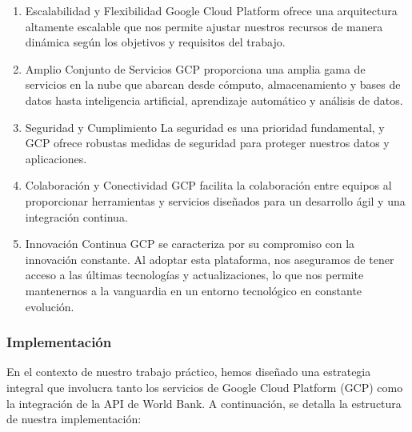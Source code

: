 \documentclass{other/docTemplate}
\begin{document}
\begin{enumerate}
\item Escalabilidad y Flexibilidad Google Cloud Platform ofrece una arquitectura altamente escalable que nos permite ajustar nuestros recursos de manera dinámica según los objetivos y requisitos del trabajo.  
\item Amplio Conjunto de Servicios GCP proporciona una amplia gama de servicios en la nube que abarcan desde cómputo, almacenamiento y bases de datos hasta inteligencia artificial, aprendizaje automático y análisis de datos. 
\item Seguridad y Cumplimiento La seguridad es una prioridad fundamental, y GCP ofrece robustas medidas de seguridad para proteger nuestros datos y aplicaciones. 
\item Colaboración y Conectividad GCP facilita la colaboración entre equipos al proporcionar herramientas y servicios diseñados para un desarrollo ágil y una integración continua.
\item Innovación Continua GCP se caracteriza por su compromiso con la innovación constante. Al adoptar esta plataforma, nos aseguramos de tener acceso a las últimas tecnologías y actualizaciones, lo que nos permite mantenernos a la vanguardia en un entorno tecnológico en constante evolución.
\end{enumerate}

\subsubsection{Implementación}

En el contexto de nuestro trabajo práctico, hemos diseñado una estrategia integral que involucra tanto los servicios de Google Cloud Platform (GCP) como la integración de la API de World Bank. A continuación, se detalla la estructura de nuestra implementación:
\end{document}
